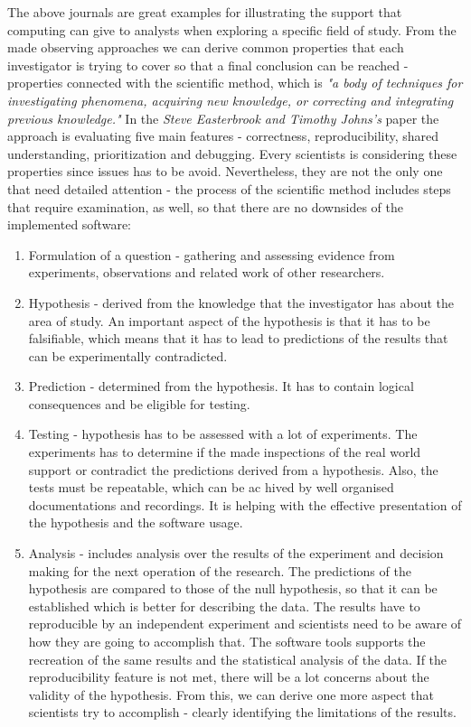 The above journals are great examples for illustrating the support that computing can give to analysts when exploring a specific field of study. From the made observing approaches we can derive common properties that each investigator is trying to cover so that a final conclusion can be reached - properties connected with the scientific method, which is \textit{"a body of techniques for investigating phenomena, acquiring new knowledge, or correcting and integrating previous knowledge."}\cite{sciMethod} In the \textit{Steve Easterbrook and Timothy Johns's} paper   the approach is evaluating five main features - correctness, reproducibility, shared understanding, prioritization and debugging.\cite{easterbrook2009engineering} Every scientists is considering these properties since issues has to be avoid. Nevertheless, they are not the only one that need detailed attention - the process of the scientific method includes steps that require examination, as well, so that there are no downsides of the implemented software:\cite{sciMethod}\cite{chasmSoftware}

\begin{enumerate}
\item Formulation of a question - gathering and assessing evidence from experiments, observations and related work of other researchers.

\item Hypothesis - derived from the knowledge that the investigator has about the area of study. An important aspect of the hypothesis is that it has to be falsifiable, which means that it has to lead to predictions of the results that can be experimentally contradicted. 

\item Prediction - determined from the hypothesis. It has to contain logical consequences and be eligible for testing.

\item Testing - hypothesis has to be assessed with a lot of experiments. The experiments has to determine if the made inspections of the real world support or contradict the predictions derived from a hypothesis. Also, the tests must be repeatable, which can be ac hived by well organised documentations and recordings. It is helping with the effective presentation of the hypothesis and the software usage.

\item Analysis - includes analysis over the results of the experiment and decision making for the next operation of the research. The predictions of the hypothesis are compared to those of the null hypothesis, so that it can be established which is better for describing the data. The results have to reproducible by an independent experiment and scientists need to be aware of how they are going to accomplish that. The software tools supports the recreation of the same results and the statistical analysis of the data. If the reproducibility feature is not met, there will be a lot concerns about the validity of the hypothesis. From this, we can derive one more aspect that scientists try to accomplish - clearly identifying the limitations of the results.

\end{enumerate}

